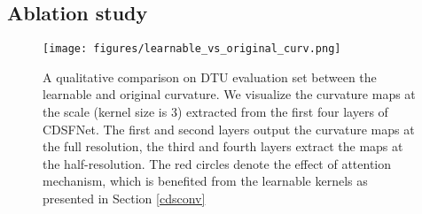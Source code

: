 \documentclass{article} \usepackage{iclr2022_conference,times}
\begin{document}
\subsection{Ablation study}
\begin{figure}[h]
\begin{center}
\texttt{[image: figures/learnable\_vs\_original\_curv.png]}
\end{center}
\caption{A qualitative comparison on DTU evaluation set \citep{aanaes2016large} between the learnable and original curvature. We visualize the curvature maps at the scale  (kernel size is 3) extracted from the first four layers of CDSFNet. The first and second layers output the curvature maps at the full resolution, the third and fourth layers extract the maps at the half-resolution. The red circles denote the effect of attention mechanism, which is benefited from the learnable kernels  as presented in Section \ref{cdsconv}}
\label{learnable_vs_original}
\end{figure}

\begin{table}[t]
\caption{Comparison between our learnable curvature and the original curvature \citep{xu2020marmvs}. All models are trained on a subset of DTU training set, using the same setups and hyperparameters. The evaluation of depth map and pointcloud is collected on DTU validation and test set, respectively.}
\label{table4}
\centering
{}
\end{table}
\end{document}
